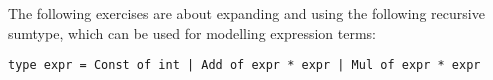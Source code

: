 The following exercises are about expanding and using the following
recursive sumtype, which can be used for modelling expression terms:
\begin{lstlisting}
type expr = Const of int | Add of expr * expr | Mul of expr * expr
\end{lstlisting}
